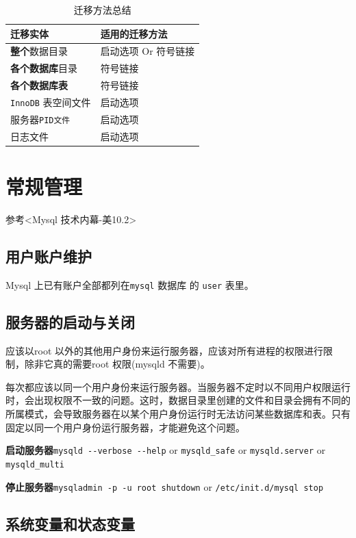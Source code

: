 \documentclass[UTF8,a4paper,12pt]{ctexbook}
\begin{document}
			\begin{table}[H]
				\centering
				\caption{迁移方法总结}
				\begin{tabular}{p{8cm}<{\centering} | p{7cm}<{\centering}}
					\toprule[1.5pt]
						迁移实体  &  适用的迁移方法\\
					\midrule
						\textbf{整个}数据目录 & 启动选项 Or 符号链接 \\
						\textbf{各个数据库}目录 & 符号链接 \\
						\textbf{各个数据库表} & 符号链接 \\
						\verb|InnoDB| 表空间文件 & 启动选项  \\
						服务器\verb|PID文件| & 启动选项  \\
						日志文件 & 启动选项  \\
					\bottomrule[1.5pt]
				\end{tabular}
			\end{table}
		
				
	\section{常规管理}
		参考<Mysql 技术内幕-美10.2>
		
		\subsection{用户账户维护}
			Mysql 上已有账户全部都列在\verb|mysql| 数据库 的 \verb|user| 表里。	
		
		\subsection{服务器的启动与关闭}
			应该以root 以外的其他用户身份来运行服务器，应该对所有进程的权限进行限制，除非它真的需要root 权限(mysqld 不需要)。
			
			每次都应该以同一个用户身份来运行服务器。当服务器不定时以不同用户权限运行时，会出现权限不一致的问题。这时，数据目录里创建的文件和目录会拥有不同的所属模式，会导致服务器在以某个用户身份运行时无法访问某些数据库和表。只有固定以同一个用户身份运行服务器，才能避免这个问题。
			
			
			\textbf{启动服务器}\verb|mysqld --verbose --help| or \verb|mysqld_safe| or \verb|mysqld.server| or \verb|mysqld_multi|
			
			\textbf{停止服务器}\verb|mysqladmin -p -u root shutdown| or \verb|/etc/init.d/mysql stop|
		
		
		\subsection{系统变量和状态变量}
\end{document}
